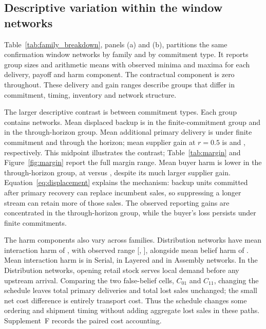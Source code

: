 \documentclass[preprint,11pt,authoryear]{elsarticle}
\begin{document}
\subsection{Descriptive variation within the window networks}
Table~\ref{tab:family_breakdown}, panels (a) and (b), partitions the same confirmation window networks by family and by commitment type. It reports group sizes and arithmetic means with observed minima and maxima for each delivery, payoff and harm component. The contractual component is zero throughout. These delivery and gain ranges describe groups that differ in commitment, timing, inventory and network structure.

The larger descriptive contrast is between commitment types. Each group contains  networks. Mean displaced backup is  in the finite-commitment group and  in the through-horizon group. Mean additional primary delivery is  under finite commitment and  through the horizon; mean supplier gain at $r=0.5$ is  and , respectively. This midpoint illustrates the contrast; Table~\ref{tab:margin} and Figure~\ref{fig:margin} report the full margin range. Mean buyer harm is lower in the through-horizon group, at  versus , despite its much larger supplier gain. Equation~\eqref{eq:displacement} explains the mechanism: backup units committed after primary recovery can replace incumbent sales, so suppressing a longer stream can retain more of those sales. The observed reporting gains are concentrated in the through-horizon group, while the buyer's loss persists under finite commitments.

The harm components also vary across families. Distribution networks have mean interaction harm of , with observed range [, ], alongside mean belief harm of . Mean interaction harm is  in Serial,  in Layered and  in Assembly networks. In the Distribution networks, opening retail stock serves local demand before any upstream arrival. Comparing the two false-belief cells, $C_{01}$ and $C_{11}$, changing the schedule leaves total primary deliveries and total lost sales unchanged; the small net cost difference is entirely transport cost. Thus the schedule changes some ordering and shipment timing without adding aggregate lost sales in these paths. Supplement~F records the paired cost accounting.
\end{document}
